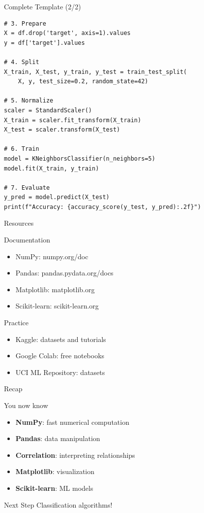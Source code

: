 \documentclass[aspectratio=169]{beamer}
\begin{document}
\begin{frame}[fragile]{Complete Template (2/2)}
\begin{lstlisting}
# 3. Prepare
X = df.drop('target', axis=1).values
y = df['target'].values

# 4. Split
X_train, X_test, y_train, y_test = train_test_split(
    X, y, test_size=0.2, random_state=42)

# 5. Normalize
scaler = StandardScaler()
X_train = scaler.fit_transform(X_train)
X_test = scaler.transform(X_test)

# 6. Train
model = KNeighborsClassifier(n_neighbors=5)
model.fit(X_train, y_train)

# 7. Evaluate
y_pred = model.predict(X_test)
print(f"Accuracy: {accuracy_score(y_test, y_pred):.2f}")
\end{lstlisting}
\end{frame}


\begin{frame}{Resources}
\begin{block}{Documentation}
\begin{itemize}
    \item NumPy: numpy.org/doc
    \item Pandas: pandas.pydata.org/docs
    \item Matplotlib: matplotlib.org
    \item Scikit-learn: scikit-learn.org
\end{itemize}
\end{block}

\begin{block}{Practice}
\begin{itemize}
    \item Kaggle: datasets and tutorials
    \item Google Colab: free notebooks
    \item UCI ML Repository: datasets
\end{itemize}
\end{block}
\end{frame}

\begin{frame}{Recap}
\begin{block}{You now know}
\begin{itemize}
    \item \textbf{NumPy}: fast numerical computation
    \item \textbf{Pandas}: data manipulation
    \item \textbf{Correlation}: interpreting relationships
    \item \textbf{Matplotlib}: visualization
    \item \textbf{Scikit-learn}: ML models
\end{itemize}
\end{block}

\vspace{0.5cm}
\begin{alertblock}{Next Step}
Classification algorithms!
\end{alertblock}
\end{frame}
\end{document}
